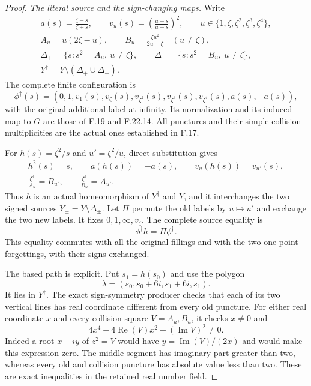 \begin{proof}
\emph{The literal source and the sign-changing maps.}
Write
\[
 \begin{gathered}
 a(s)=\frac{\zeta-s}{\zeta+s},\qquad
 v_u(s)=\left(\frac{u-s}{u+s}\right)^2,\qquad
 u\in\{1,\zeta,\zeta^2,\zeta^3,\zeta^4\},\\
 A_u=u(2\zeta-u),\qquad
 B_u=\frac{\zeta u^2}{2u-\zeta}
       \quad(u\ne\zeta),\\
 \Delta_+=\{s:s^2=A_u,\ u\ne\zeta\},\qquad
 \Delta_-=\{s:s^2=B_u,\ u\ne\zeta\},\\
 Y^\dagger=Y\setminus(\Delta_+\cup\Delta_-).
 \end{gathered}                                                \tag{F.23.5}
\]
The complete finite configuration is
\[
 \phi^\dagger(s)=
 (0,1,v_1(s),v_\zeta(s),v_{\zeta^2}(s),
                     v_{\zeta^3}(s),v_{\zeta^4}(s),a(s),-a(s)),
                                                               \tag{F.23.6}
\]
with the original additional label at infinity. Its normalization
and its induced map to $G$ are those of F.19 and F.22.14.
All punctures and their simple collision multiplicities are
the actual ones established in F.17.

For $h(s)=\zeta^2/s$ and $u'=\zeta^2/u$, direct substitution gives
\[
 \begin{gathered}
 h^2(s)=s,\qquad a(h(s))=-a(s),\qquad
 v_u(h(s))=v_{u'}(s),\\
 \frac{\zeta^4}{A_u}=B_{u'},\qquad
 \frac{\zeta^4}{B_u}=A_{u'}.
 \end{gathered}                                                \tag{F.23.7}
\]
Thus $h$ is an actual homeomorphism of $Y^\dagger$ and $Y$,
and it interchanges the two signed sources
$Y_\pm=Y\setminus\Delta_\pm$.
Let $\Pi$ permute the old labels by $u\mapsto u'$ and exchange
the two new labels. It fixes $0,1,\infty,v_\zeta$.
The complete source equality is
\[
                  \phi^\dagger h=\Pi\phi^\dagger .            \tag{F.23.8}
\]
This equality commutes with all the original fillings and with
the two one-point forgettings, with their signs exchanged.

The based path is explicit. Put $s_1=h(s_0)$ and use the polygon
\[
                 \lambda=(s_0, s_0+6i, s_1+6i, s_1).
                                                               \tag{F.23.9}
\]
It lies in $Y^\dagger$. The exact sign-symmetry producer checks
that each of its two vertical lines has real coordinate different
from every old puncture. For either real coordinate $x$ and every
collision square $V=A_u,B_u$, it checks $x\ne0$ and
\[
                  4x^4-4\operatorname{Re}(V)x^2
                            -(\operatorname{Im}V)^2\ne0.     \tag{F.23.10}
\]
Indeed a root $x+iy$ of $z^2=V$ would have
$y=\operatorname{Im}(V)/(2x)$ and would make this expression zero.
The middle segment has imaginary part greater than two, whereas
every old and collision puncture has absolute value less than two.
These are exact inequalities in the retained real number field.


\end{proof}
